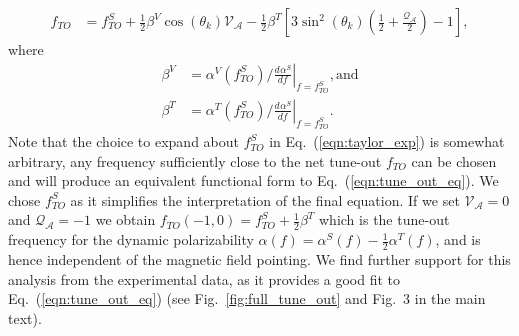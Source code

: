 \documentclass{article}
\newcommand{\derivn}[3][{}]{
    \frac{d^{#1} #2}{d #3^{#1}}
}
\begin{document}
 \begin{align}
    f_{TO} &= 
    f^{S}_{TO}
    +\frac{1}{2}\beta^V  \cos \left( \theta_k \right) \mathcal{V_{A}}
    - \frac{1}{2}\beta^T  \left[3 \sin^2\left( \theta_k \right) \left(\frac{1}{2} +  \frac{\mathcal{Q_{A}}}{2}\right) -1 \right], \label{eqn:tune_out_eq} 
\end{align}
where
 \begin{align}
  \beta^V &= \alpha^V(f^{S}_{TO}) \bigg/ \left. \derivn{\alpha^S}{f} \right|_{f=f^{S}_{TO}} \mathrm{, and}\\
  \beta^T &= \alpha^T(f^{S}_{TO}) \bigg/ \left. \derivn{\alpha^S}{f} \right|_{f=f^{S}_{TO}} .
 \end{align}
Note that the choice to expand about \(f^{S}_{TO}\) in Eq.~(\ref{eqn:taylor_exp}) is somewhat arbitrary, any frequency sufficiently close to the net tune-out \(f_{TO}\) can be chosen and will produce an equivalent functional form to Eq.~(\ref{eqn:tune_out_eq}).  We chose \(f^{S}_{TO}\) as it simplifies the interpretation of the final equation. If we set \(\mathcal{V_{A}}=0\) and \(\mathcal{Q_{A}}=-1\) we obtain \(f_{TO}(-1,0) = f^{S}_{TO} + \frac{1}{2} \beta^T\) which is the tune-out frequency for the dynamic polarizability \(\alpha(f) = \alpha^S(f) - \frac{1}{2}  \alpha^T(f)\), and is hence independent of the magnetic field pointing. We find further support for this analysis from the experimental data, as it provides a good fit to Eq.~(\ref{eqn:tune_out_eq}) (see Fig.~\ref{fig:full_tune_out} and Fig.~3 in the main text).



\end{document}
